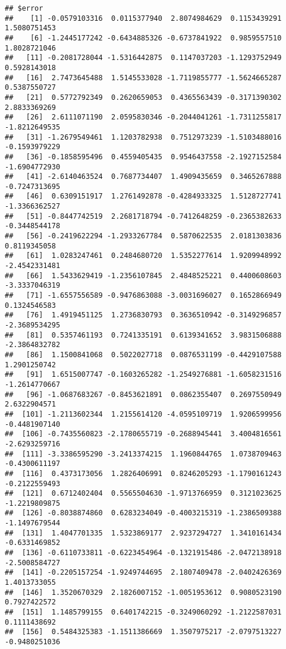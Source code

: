 \documentclass[
]{article}
\begin{document}
\begin{verbatim}
## $error
##    [1] -0.0579103316  0.0115377940  2.8074984629  0.1153439291  1.5080751453
##    [6] -1.2445177242 -0.6434885326 -0.6737841922  0.9859557510  1.8028721046
##   [11] -0.2081728044 -1.5316442875  0.1147037203 -1.1293752949  0.5928143018
##   [16]  2.7473645488  1.5145533028 -1.7119855777 -1.5624665287  0.5387550727
##   [21]  0.5772792349  0.2620659053  0.4365563439 -0.3171390302  2.8833369269
##   [26]  2.6111071190  2.0595830346 -0.2044041261 -1.7311255817 -1.8212649535
##   [31] -1.2679549461  1.1203782938  0.7512973239 -1.5103488016 -0.1593979229
##   [36] -0.1858595496  0.4559405435  0.9546437558 -2.1927152584 -1.6904772930
##   [41] -2.6140463524  0.7687734407  1.4909435659  0.3465267888 -0.7247313695
##   [46]  0.6309151917  1.2761492878 -0.4284933325  1.5128727741 -1.3366362527
##   [51] -0.8447742519  2.2681718794 -0.7412648259 -0.2365382633 -0.3448544178
##   [56] -0.2419622294 -1.2933267784  0.5870622535  2.0181303836  0.8119345058
##   [61]  1.0283247461  0.2484680720  1.5352277614  1.9209948992 -2.4542331481
##   [66]  1.5433629419 -1.2356107845  2.4848525221  0.4400608603 -3.3337046319
##   [71] -1.6557556589 -0.9476863088 -3.0031696027  0.1652866949  0.1324546583
##   [76]  1.4919451125  1.2736830793  0.3636510942 -0.3149296857 -2.3689534295
##   [81]  0.5357461193  0.7241335191  0.6139341652  3.9831506888 -2.3864832782
##   [86]  1.1500841068  0.5022027718  0.0876531199 -0.4429107588  1.2901250742
##   [91]  1.6515007747 -0.1603265282 -1.2549276881 -1.6058231516 -1.2614770667
##   [96] -1.0687683267 -0.8453621891  0.0862355407  0.2697550949  2.6322904571
##  [101] -1.2113602344  1.2155614120 -4.0595109719  1.9206599956 -0.4481907140
##  [106] -0.7435560823 -2.1780655719 -0.2688945441  3.4004816561 -2.6293259716
##  [111] -3.3386595290 -3.2413374215  1.1960844765  1.0738709463 -0.4300611197
##  [116]  0.4373173056  1.2826406991  0.8246205293 -1.1790161243 -0.2122559493
##  [121]  0.6712402404  0.5565504630 -1.9713766959  0.3121023625 -1.2219809875
##  [126] -0.8038874860  0.6283234049 -0.4003215319 -1.2386509388 -1.1497679544
##  [131]  1.4047701335  1.5323869177  2.9237294727  1.3410161434 -0.6331469852
##  [136] -0.6110733811 -0.6223454964 -0.1321915486 -2.0472138918 -2.5008584727
##  [141] -0.2205157254 -1.9249744695  2.1807409478 -2.0402426369  1.4013733055
##  [146]  1.3520670329  2.1826007152 -1.0051953612  0.9080523190  0.7927422572
##  [151]  1.1485799155  0.6401742215 -0.3249060292 -1.2122587031  0.1111438692
##  [156]  0.5484325383 -1.1511386669  1.3507975217 -2.0797513227 -0.9480251036

\end{verbatim}
\end{document}

